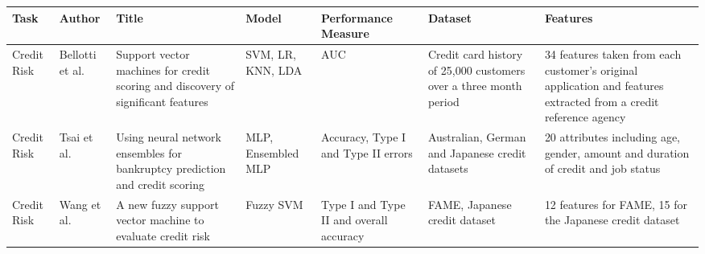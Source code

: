 \documentclass[a4paper, 12pt]{article}
\begin{document}
\begin{table}[H]
\label{table2}
\vskip 0.1in
\bgroup
\def\arraystretch{1.5}
\begin{tabular}{ | p{1.9cm} | p{1.6cm}| p{2.1cm} | p{1.4cm}| p{2.3cm}| p{1.9cm}| p{2.2cm}| }
\hline
\textbf{Task} & \textbf{Author}  & \textbf{Title}  & \textbf{Model} & \textbf{Performance Measure}  & \textbf{Dataset}  & \textbf{Features} \\
  \hline
Credit Risk &
Bellotti et al. \cite{bellotti2009support} &
Support vector machines for credit scoring and discovery of significant features &
SVM, LR, KNN, LDA &
AUC &
Credit card history of 25,000 customers over a three month period &
34 features taken from each customer’s original application and features extracted from a credit reference agency
\\
 \hline
 Credit Risk &
Tsai et al. \cite{tsai2008using} &
Using neural network ensembles for bankruptcy prediction and credit scoring &
MLP, Ensembled MLP &
Accuracy, Type I and Type II errors &
Australian, German and Japanese credit datasets &
20 attributes including age, gender, amount and duration of credit and job status
\\
\hline

Credit Risk &
Wang et al. \cite{wang2005new} &
A new fuzzy support vector machine to evaluate credit risk &
Fuzzy SVM &
Type I and Type II and overall accuracy &
FAME, Japanese credit dataset &
12 features for FAME, 15 for the Japanese credit dataset 
\\
\hline


\end{tabular}
\egroup
\end{table}
\newpage
\end{document}
